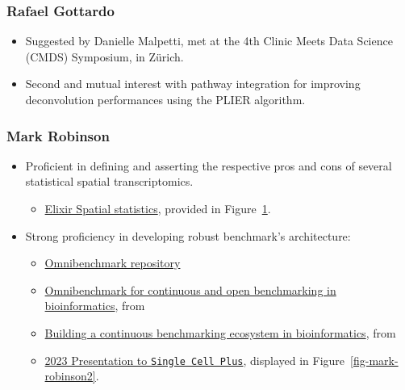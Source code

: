 \documentclass[
  letterpaper,
]{book}
\providecommand{\tightlist}{%
  \setlength{\itemsep}{0pt}\setlength{\parskip}{0pt}}\usepackage{longtable,booktabs,array}
\begin{document}
\subsubsection{Rafael Gottardo}\label{rafael-gottardo}

\begin{itemize}
\tightlist
\item
  Suggested by Danielle Malpetti, met at the 4th Clinic Meets Data
  Science (CMDS) Symposium, in Zürich.
\item
  Second and mutual interest with pathway integration for improving
  deconvolution performances using the PLIER algorithm.
\end{itemize}

\subsubsection{Mark Robinson}\label{mark-robinson}

\begin{itemize}
\tightlist
\item
  Proficient in defining and asserting the respective pros and cons of
  several statistical spatial transcriptomics.

  \begin{itemize}
  \tightlist
  \item
    \href{https://github.com/elixir-europe-training/ELIXIR-SCO-spatial-omics}{Elixir
    Spatial statistics}, provided in Figure~\ref{fig-mark-robinson}.
  \end{itemize}
\end{itemize}

\begin{figure}

\centering{

}

\caption{\label{fig-mark-robinson}}

\end{figure}%

\begin{itemize}
\item
  Strong proficiency in developing robust benchmark's architecture:

  \begin{itemize}
  \tightlist
  \item
    \href{https://omnibenchmark.org/}{Omnibenchmark repository}
  \item
    \href{https://arxiv.org/pdf/2409.17038}{Omnibenchmark for continuous
    and open benchmarking in bioinformatics}, from
    \autocite{mallona2024}
  \item
    \href{https://arxiv.org/pdf/2409.15472}{Building a continuous
    benchmarking ecosystem in bioinformatics}, from
    \autocite{mallona2024a}
  \item
    \href{https://www.birs.ca/workshops/2023/23w5090/files/Mark\%20Robinson/Robinson_BIRS_benchmarking.pdf}{2023
    Presentation to \texttt{Single\ Cell\ Plus}}, displayed in
    Figure~\ref{fig-mark-robinson2}.
  \end{itemize}
\end{itemize}
\end{document}
